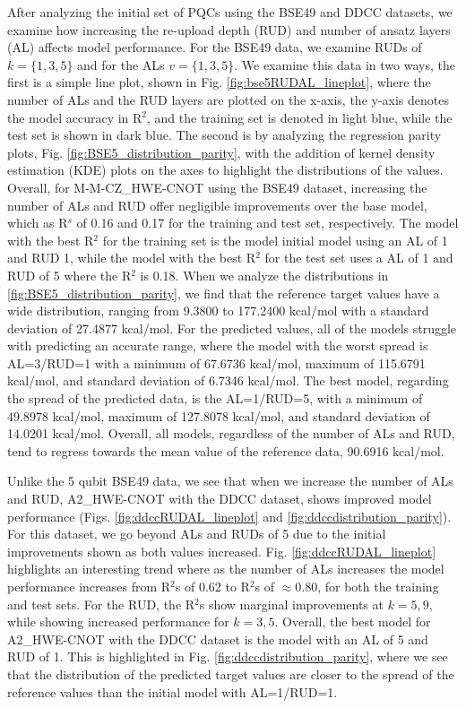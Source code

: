 \documentclass[journal=jacsat,manuscript=article]{achemso}
\begin{document}
After analyzing the initial set of PQCs using the BSE49 and DDCC datasets, we examine how increasing the re-upload depth (RUD) and number of ansatz layers (AL) affects model performance.
For the BSE49 data, we examine RUDs of $k=\{1,3,5\}$ and for the ALs $v=\{1,3,5\}$.
We examine this data in two ways, the first is a simple line plot, shown in Fig. \ref{fig:bse5RUDAL_lineplot}, where the number of ALs and the RUD layers are plotted on the x-axis, the y-axis denotes the model accuracy in R$^{2}$, and the training set is denoted in light blue, while the test set is shown in dark blue.
The second is by analyzing the regression parity plots, Fig. \ref{fig:BSE5_distribution_parity}, with the addition of kernel density estimation (KDE) plots on the axes to highlight the distributions of the values.
Overall, for M-M-CZ{\_}HWE-CNOT using the BSE49 dataset, increasing the number of ALs and RUD offer negligible improvements over the base model, which as R$^{s}$ of 0.16 and 0.17 for the training and test set, respectively.
The model with the best R$^{2}$ for the training set is the model initial model using an AL of 1 and RUD 1, while the model with the best R$^{2}$ for the test set uses a AL of 1 and RUD of 5 where the R$^{2}$ is 0.18.
When we analyze the distributions in \ref{fig:BSE5_distribution_parity}, we find that the reference target values have a wide distribution, ranging from 9.3800 to 177.2400 kcal/mol with a standard deviation of 27.4877 kcal/mol.
For the predicted values, all of the models struggle with predicting an accurate range, where the model with the worst spread is AL=3/RUD=1 with a minimum of 67.6736 kcal/mol, maximum of 115.6791 kcal/mol, and standard deviation of 6.7346 kcal/mol.
The best model, regarding the spread of the predicted data, is the AL=1/RUD=5, with a minimum of 49.8978 kcal/mol, maximum of 127.8078 kcal/mol, and standard deviation of 14.0201 kcal/mol. 
Overall, all models, regardless of the number of ALs and RUD, tend to regress towards the mean value of the reference data, 90.6916 kcal/mol.

Unlike the 5 qubit BSE49 data, we see that when we increase the number of ALs and RUD, A2{\_}HWE-CNOT with the DDCC dataset, shows improved model performance (Figs. \ref{fig:ddccRUDAL_lineplot} and \ref{fig:ddccdistribution_parity}).
For this dataset, we go beyond ALs and RUDs of 5 due to the initial improvements shown as both values increased.
Fig. \ref{fig:ddccRUDAL_lineplot} highlights an interesting trend where as the number of ALs increases the model performance increases from R$^{2}$s of 0.62 to R$^{2}$s of $\approx 0.80$, for both the training and test sets.
For the RUD, the R$^{2}$s show marginal improvements at $k=5,9$, while showing increased performance for $k=3,5$. 
Overall, the best model for A2{\_}HWE-CNOT with the DDCC dataset is the model with an AL of 5 and RUD of 1.
This is highlighted in Fig. \ref{fig:ddccdistribution_parity}, where we see that the distribution of the predicted target values are closer to the spread of the reference values than the initial model with AL=1/RUD=1.
\end{document}
